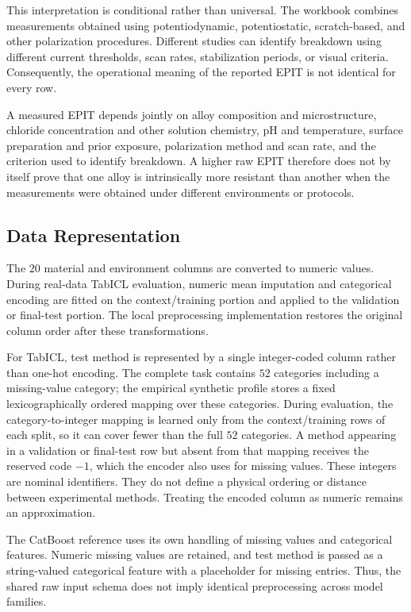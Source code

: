 \documentclass{article}
\begin{document}
This interpretation is conditional rather than universal. The workbook
combines measurements obtained using potentiodynamic, potentiostatic,
scratch-based, and other polarization procedures. Different studies can
identify breakdown using different current thresholds, scan rates,
stabilization periods, or visual criteria. Consequently, the operational
meaning of the reported EPIT is not identical for every row.

A measured EPIT depends jointly on alloy composition and microstructure,
chloride concentration and other solution chemistry, pH and temperature,
surface preparation and prior exposure, polarization method and scan rate,
and the criterion used to identify breakdown. A higher raw EPIT therefore
does not by itself prove that one alloy is intrinsically more resistant than
another when the measurements were obtained under different environments or
protocols.

\subsection{Data Representation}
\label{sec:data-representation}

The \(20\) material and environment columns are converted to numeric values.
During real-data TabICL evaluation, numeric mean imputation and categorical
encoding are fitted on the context/training portion and applied to the
validation or final-test portion. The local preprocessing implementation
restores the original column order after these transformations.

For TabICL, test method is represented by a single integer-coded column
rather than one-hot encoding. The complete task contains \(52\) categories
including a missing-value category; the empirical synthetic profile stores a fixed
lexicographically ordered mapping over these categories. During evaluation,
the category-to-integer mapping is learned only from the context/training
rows of each split, so it can cover fewer than the full \(52\) categories.
A method appearing in a validation or final-test row but absent from that
mapping receives the reserved code \(-1\), which the encoder also uses for
missing values. These integers are nominal identifiers. They do
not define a physical ordering or distance between experimental methods.
Treating the encoded column as numeric remains an approximation.

The CatBoost reference uses its own handling of missing values and categorical
features. Numeric missing values are retained, and test method is passed as a
string-valued categorical feature with a placeholder for missing entries.
Thus, the shared raw input schema does not imply identical preprocessing
across model families.
\end{document}

